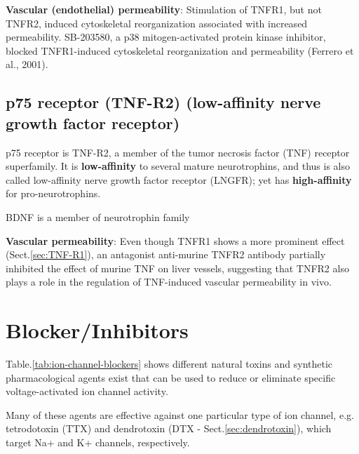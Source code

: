 {\bf Vascular (endothelial) permeability}: Stimulation of TNFR1, but not TNFR2,
induced cytoskeletal reorganization associated with increased permeability.
SB-203580, a p38 mitogen-activated protein kinase inhibitor, blocked
TNFR1-induced cytoskeletal reorganization and permeability (Ferrero et al.,
2001).



\subsection{p75 receptor (TNF-R2) (low-affinity nerve growth factor receptor)}
\label{sec:p75-receptor}
\label{sec:TNF-R2}

p75 receptor is TNF-R2, a member of the tumor necrosis factor (TNF) receptor
superfamily. It is {\bf low-affinity} to several mature neurotrophins, and thus
is also called low-affinity nerve growth factor receptor (LNGFR); yet has {\bf
high-affinity}  for pro-neurotrophins. 

BDNF is a member of neurotrophin family

{\bf Vascular permeability}: Even though TNFR1 shows a more prominent effect
(Sect.\ref{sec:TNF-R1}), an antagonist anti-murine TNFR2 antibody partially
inhibited the effect of murine TNF on liver vessels, suggesting that TNFR2 also
plays a role in the regulation of TNF-induced vascular permeability in vivo.




\section{Blocker/Inhibitors}
\label{sec:blockers-inhibitors}

Table.\ref{tab:ion-channel-blockers} shows different 
natural toxins and synthetic pharmacological agents
exist that can be used to reduce or eliminate specific voltage-activated
ion channel activity.

Many of these agents are effective against one particular type of ion channel,
e.g. tetrodotoxin (TTX) and dendrotoxin (DTX - Sect.\ref{sec:dendrotoxin}),
which target Na+ and K+ channels, respectively.

